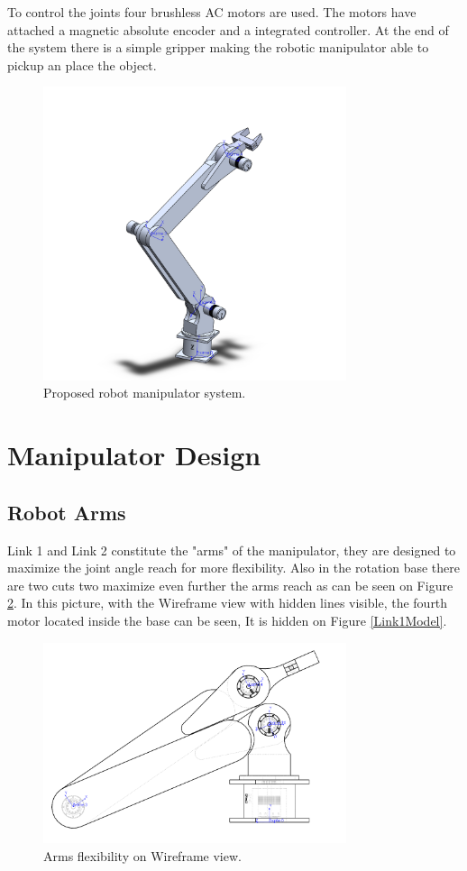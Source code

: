 \documentclass[transmag]{IEEEtran}
\begin{document}
To control the joints four brushless AC motors are used. The motors have attached a magnetic absolute encoder and a integrated controller.
At the end of the system there is a simple gripper making the robotic manipulator able to pickup an place the object.  



\begin{figure}
\centerline{\includegraphics[width=3.5in]{./images/Model}}
\caption{Proposed robot manipulator system.\label{Model}}
\end{figure}



\section{Manipulator Design}


\subsection{Robot Arms}
Link 1 and Link 2 constitute the "arms" of the manipulator, they are designed to maximize the joint angle reach for more flexibility. Also in the rotation base there are two cuts two maximize even further the arms reach as can be seen on Figure \ref{Arms}. In this picture, with the Wireframe view with hidden lines visible, the fourth motor located inside the base can be seen, It is hidden on Figure \ref{Link1Model}.


\begin{figure}
\centerline{\includegraphics[width=3.5in]{./images/Arms}}
\caption{Arms flexibility on Wireframe view.\label{Arms}}
\end{figure}
\end{document}
